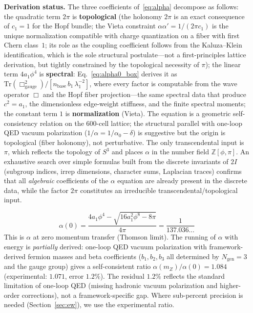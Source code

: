 \documentclass[12pt,a4paper]{article}
\theoremstyle{definition}
\begin{document}
\textbf{Derivation status.}  The three coefficients of~\eqref{eq:alpha} decompose as follows: the quadratic term $2\pi$ is \textbf{topological} (the holonomy $2\pi$ is an exact consequence of $c_1 = 1$ for the Hopf bundle; the Vieta constraint $\alpha\alpha' = 1/(2\pi c_1)$ is the unique normalization compatible with charge quantization on a fiber with first Chern class~$1$; its role as the coupling coefficient follows from the Kaluza--Klein identification, which is the sole structural postulate---not a first-principles lattice derivation, but tightly constrained by the topological necessity of $\pi$); the linear term $4a_1\phi^4$ is \textbf{spectral}: Eq.~\eqref{eq:alpha0_box} derives it as $\mathrm{Tr}(\Box_{\mathrm{gauge}}^2)/[n_{\mathrm{base}}\,b_1\,\lambda_1^{-2}]$, where every factor is computable from the wave operator $\Box$ and the Hopf fiber projection---the same spectral data that produce $c^2 = a_1$, the dimensionless edge-weight stiffness, and the finite spectral moments; the constant term $1$ is \textbf{normalization} (Vieta).  The equation is a geometric self-consistency relation on the 600-cell lattice; the structural parallel with one-loop QED vacuum polarization ($1/\alpha = 1/\alpha_0 - \delta$) is suggestive but the origin is topological (fiber holonomy), not perturbative.  The only transcendental input is $\pi$, which reflects the topology of $S^3$ and places $\alpha$ in the number field $\mathbb{Z}[\phi, \pi]$.  An exhaustive search over simple formulas built from the discrete invariants of $2I$ (subgroup indices, irrep dimensions, character sums, Laplacian traces) confirms that all \emph{algebraic} coefficients of the $\alpha$ equation are already present in the discrete data, while the factor $2\pi$ constitutes an irreducible transcendental/topological input.

\begin{equation}
\alpha(0) = \frac{4a_1\phi^4 - \sqrt{16a_1^2\phi^8 - 8\pi}}{4\pi} = \frac{1}{137.036\ldots}
\end{equation}
This is $\alpha$ at zero momentum transfer (Thomson limit).  The running of $\alpha$ with energy is \emph{partially} derived: one-loop QED vacuum polarization with framework-derived fermion masses and beta coefficients ($b_1, b_2, b_3$ all determined by $N_{\text{gen}} = 3$ and the gauge group) gives a self-consistent ratio $\alpha(m_Z)/\alpha(0) = 1.084$ (experimental: $1.071$, error $1.2\%$).  The residual $1.2\%$ reflects the standard limitation of one-loop QED (missing hadronic vacuum polarization and higher-order corrections), not a framework-specific gap.  Where sub-percent precision is needed (Section~\ref{sec:ew}), we use the experimental ratio.
\end{document}

